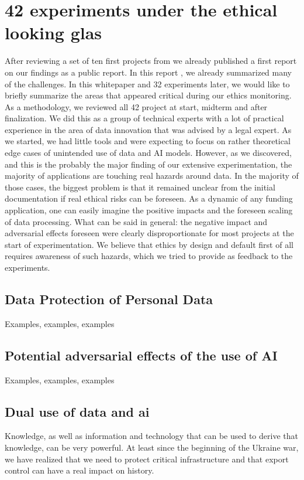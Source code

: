 \section{42 experiments under the ethical looking glas}\label{}

After reviewing a set of ten first projects from we already published a first report on our findings as a public report. In this report \cite{DXX}, 
we already summarized many of the challenges. In this whitepaper and 32 experiments later, we would like to briefly summarize the areas that appeared critical during our ethics monitoring.
As a methodology, we reviewed all 42 project at start, midterm and after finalization. We did this as a group of technical experts with a lot of practical experience in the area of data innovation that was advised by a legal expert. As we started, we had little tools and were expecting to focus on rather theoretical edge cases of unintended use of data and AI models. However, as we discovered, and this is the probably the major finding of our extensive experimentation, the majority of applications are touching real hazards around data. In the majority of those cases, the biggest problem is that it remained unclear from the initial documentation if real ethical risks can be foreseen. As a dynamic of any funding application, one can easily imagine the positive impacts and the foreseen scaling of data processing. What can be said in general: the negative impact and adversarial effects foreseen were clearly disproportionate for most projects at the start of experimentation. We believe that ethics by design and default first of all requires awareness of such hazards, which we tried to provide as feedback to the experiments.

\subsection{Data Protection of Personal Data}\label{}
Examples, examples, examples

\subsection{Potential adversarial effects of the use of AI}\label{}
Examples, examples, examples

\subsection{Dual use of data and ai}
Knowledge, as well as information and technology that can be used to derive that knowledge, can be very powerful. At least since the beginning of the Ukraine war, we have realized that we need to protect critical infrastructure and that export control can have a real impact on history. 

